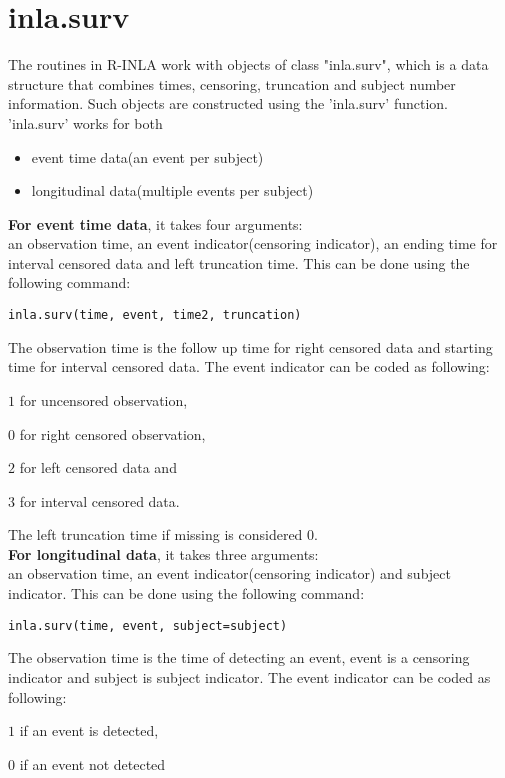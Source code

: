 \documentclass[a4paper,11pt]{article}
\begin{document}
\section*{inla.surv}
The routines in R-INLA work with objects of class "inla.surv", which is a data structure that combines times, censoring, truncation and subject number information. Such objects are constructed using the 'inla.surv' function. 'inla.surv' works for both 
\begin{itemize}
\item event time data(an event per subject)
\item longitudinal data(multiple events per subject)
\end{itemize}


\textbf{For event time data}, it takes four arguments: \\
an observation time, an event indicator(censoring indicator), an ending time for interval censored data and left  truncation time. This can be done using the following command:
\small
\begin{verbatim}
inla.surv(time, event, time2, truncation)
\end{verbatim}
\small
The observation time is the follow up time for right censored data and starting time for interval censored data. The event indicator can be coded as following: 
\begin{description}
\item$1$ for uncensored observation, 
\item$0$ for right censored observation, 
\item$2$ for left censored data and 
\item$3$ for interval censored data. 
\end{description}
The left truncation time if missing is considered $0$.\\


\textbf{For longitudinal data}, it takes three arguments: \\
an observation time, an event indicator(censoring indicator) and subject indicator. This can be done using the following command:
\small
\begin{verbatim}
inla.surv(time, event, subject=subject)
\end{verbatim}
\small
The observation time is the time of detecting an event, event is a censoring indicator and subject is subject indicator. The event indicator can be coded as following: 
\begin{description}
\item$1$ if an event is detected, 
\item$0$ if an event not detected 
\end{description}
\end{document}
